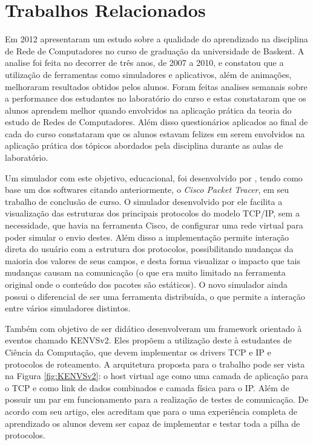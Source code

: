 
\chapter{Trabalhos Relacionados}
\label{chap:trabRelac}

Em 2012  apresentaram um estudo sobre a qualidade do aprendizado na disciplina de Rede de Computadores no curso de graduação da universidade de Baskent. A analise foi feita no decorrer de três anos, de 2007 a 2010, e constatou que a utilização de ferramentas como simuladores e aplicativos, além de animações, melhoraram resultados obtidos pelos alunos. Foram feitas analises semanais sobre a performance dos estudantes no laboratório do curso e estas constataram que os alunos aprendem melhor quando envolvidos na aplicação pr\'atica da teoria do estudo de Redes de Computadores. Além disso questionários aplicados ao final de cada do curso constataram que os alunos estavam felizes em serem envolvidos na aplicação prática dos tópicos abordados pela disciplina durante as aulas de laboratório.


Um simulador com este objetivo, educacional, foi desenvolvido por , tendo como base um dos softwares citando anteriormente, o \textit{Cisco Packet Tracer}, em seu trabalho de conclusão de curso. O simulador desenvolvido por ele facilita a visualização das estruturas dos principais protocolos do modelo TCP/IP, sem a necessidade, que havia na ferramenta Cisco, de configurar uma rede virtual para poder simular o envio destes. Além disso a implementação permite interação direta do usuário com a estrutura dos protocolos, possibilitando mudanças da maioria dos valores de seus campos, e desta forma visualizar o impacto que tais mudanças causam na comunicação (o que era muito limitado na ferramenta original onde o conteúdo dos pacotes são estáticos). O novo simulador ainda possui o diferencial de ser uma ferramenta distribuída, o que permite a interação entre vários simuladores distintos.


Também com objetivo de ser didático  desenvolveram um framework orientado à eventos chamado KENVSv2. Eles propõem a utilização deste à estudantes de Ciência da Computação, que devem implementar os drivers TCP e IP e protocolos de roteamento. A arquitetura proposta para o trabalho pode ser vista na Figura \ref{fig:KENVSv2}: o host virtual age como uma camada de aplicaç\~ao para o TCP e como link de dados combinados e camada física para o IP. Além de possuir um par em funcionamento para a realização de testes de comunicação. De acordo com seu artigo, eles acreditam que para o uma experi\^encia completa de aprendizado os alunos devem ser capaz de implementar e testar toda a pilha de protocolos.



